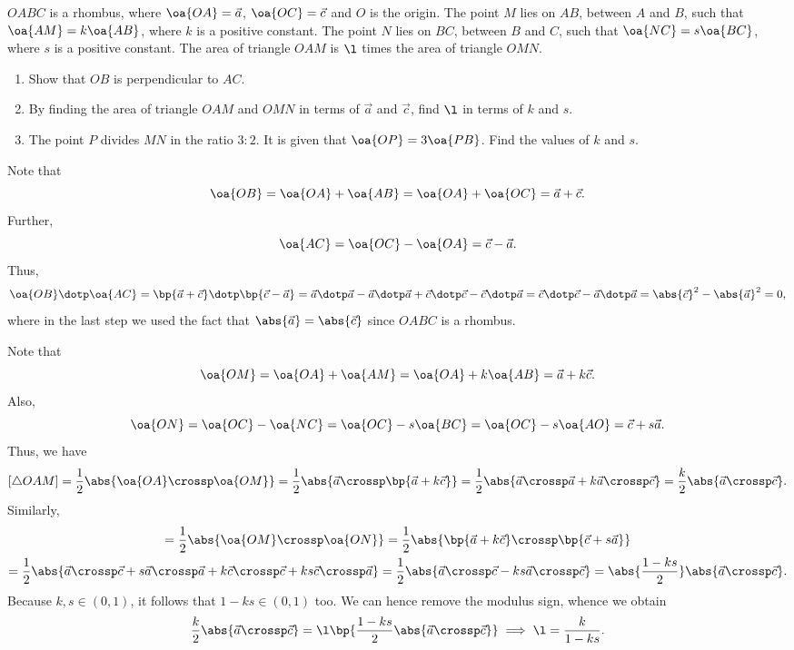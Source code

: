 \begin{problem}
    $OABC$ is a rhombus, where $\oa{OA} = \vec a$, $\oa{OC} = \vec c$ and $O$ is the origin. The point $M$ lies on $AB$, between $A$ and $B$, such that $\oa{AM} = k \oa{AB}$, where $k$ is a positive constant. The point $N$ lies on $BC$, between $B$ and $C$, such that $\oa{NC} = s \oa{BC}$, where $s$ is a positive constant. The area of triangle $OAM$ is $\l$ times the area of triangle $OMN$.

    \begin{enumerate}
        \item Show that $OB$ is perpendicular to $AC$.
        \item By finding the area of triangle $OAM$ and $OMN$ in terms of $\vec a$ and $\vec c$, find $\l$ in terms of $k$ and $s$.
        \item The point $P$ divides $MN$ in the ratio $3:2$. It is given that $\oa{OP} = 3 \oa{PB}$. Find the values of $k$ and $s$.
    \end{enumerate}
\end{problem}
\begin{solution}
    \begin{ppart}
        Note that \[\oa{OB} = \oa{OA} + \oa{AB} = \oa{OA} + \oa{OC} = \vec a + \vec c.\] Further, \[\oa{AC} = \oa{OC} - \oa{OA} = \vec c - \vec a.\] Thus, \[\oa{OB} \dotp \oa{AC} = \bp{\vec a + \vec c} \dotp \bp{\vec c - \vec a} = \vec a \dotp \vec a - \vec a \dotp \vec a + \vec c \dotp \vec c - \vec c \dotp \vec a = \vec c \dotp \vec c - \vec a \dotp \vec a = \abs{\vec c}^2 - \abs{\vec a}^2 = 0,\] where in the last step we used the fact that $\abs{\vec a} = \abs{\vec c}$ since $OABC$ is a rhombus.
    \end{ppart}
    \begin{ppart}
        Note that \[\oa{OM} = \oa{OA} + \oa{AM} = \oa{OA} + k \oa{AB} = \vec a + k \vec c.\] Also, \[\oa{ON} = \oa{OC} - \oa{NC} = \oa{OC} - s \oa{BC} = \oa{OC} - s \oa{AO} = \vec c + s \vec a.\] Thus, we have \[[\triangle OAM] = \frac12 \abs{\oa{OA} \crossp \oa{OM}} = \frac12 \abs{\vec a \crossp \bp{\vec a + k \vec c}} = \frac12 \abs{\vec a \crossp \vec a + k \vec a \crossp \vec c} = \frac{k}{2} \abs{\vec a \crossp \vec c}.\] Similarly,
        \begin{gather*}
            [\triangle OMN] = \frac12 \abs{\oa{OM} \crossp \oa{ON}} = \frac12 \abs{\bp{\vec a + k \vec c} \crossp \bp{\vec c + s \vec a}}\\
            = \frac12 \abs{\vec a \crossp \vec c + s \vec a \crossp \vec a + k \vec c \crossp \vec c + k s \vec c \crossp \vec a} = \frac12 \abs{\vec a \crossp \vec c - ks \vec a \crossp \vec c} = \abs{\frac{1-ks}{2}} \abs{\vec a \crossp \vec c}.
        \end{gather*}
        Because $k, s \in (0, 1)$, it follows that $1-ks \in (0, 1)$ too. We can hence remove the modulus sign, whence we obtain \[\frac{k}{2} \abs{\vec a \crossp \vec c} = \l \bp{\frac{1-ks}{2} \abs{\vec a \crossp \vec c}} \implies \l = \frac{k}{1-ks}.\]
    \end{ppart}
\end{solution}